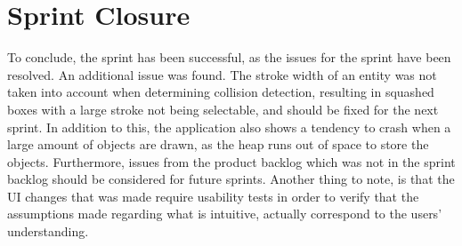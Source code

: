 \section{Sprint Closure}
To conclude, the sprint has been successful, as the issues for the sprint have been resolved. 
An additional issue was found. The stroke width of an entity was not taken into account when determining collision detection, resulting in squashed boxes with a large stroke not being selectable, and should be fixed for the next sprint. In addition to this, the application also shows a tendency to crash when a large amount of objects are drawn, as the heap runs out of space to store the objects. 
Furthermore, issues from the product backlog which was not in the sprint backlog should be considered for future sprints.
Another thing to note, is that the UI changes that was made require usability tests in order to verify that the assumptions made regarding what is intuitive, actually correspond to the users' understanding.
